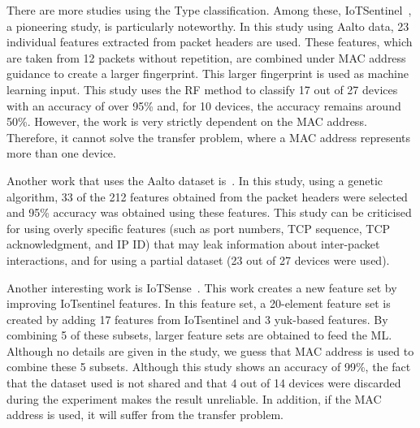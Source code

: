 \documentclass[journal]{IEEEtran}
\begin{document}
There are more studies using the Type classification. Among these, IoTSentinel~\cite{miettinen2017iot}, a pioneering study, is particularly noteworthy. In this study using Aalto data, 23 individual features extracted from packet headers are used. These features, which are taken from 12 packets without repetition, are combined under MAC address guidance to create a larger fingerprint.  This larger fingerprint is used as machine learning input.  This study uses the RF method to classify 17 out of 27 devices with an accuracy of over 95\% and, for 10 devices, the accuracy remains around 50\%. However, the work is very strictly dependent on the MAC address. Therefore, it cannot solve the transfer problem, where a MAC address represents more than one device.


Another work that uses the Aalto dataset is~\cite{aksoy2019automated}. In this study, using a genetic algorithm, 33 of the 212 features obtained from the packet headers were selected and 95\% accuracy was obtained using these features.  This study can be criticised for using overly specific features  (such as port numbers, TCP sequence, TCP
acknowledgment,  and IP ID) that may leak information about inter-packet interactions, and for using a partial dataset (23 out of 27 devices were used).

Another interesting work is IoTSense~\cite{bezawada2018behavioral}. This work creates a new feature set by improving IoTsentinel features. In this feature set, a 20-element feature set is created by adding 17 features from IoTsentinel and 3 yuk-based features. By combining 5 of these subsets, larger feature sets are obtained to feed the ML. Although no details are given in the study, we guess that MAC address is used to combine these 5 subsets. Although this study shows an accuracy of 99\%, the fact that the dataset used is not shared and that 4 out of 14 devices were discarded during the experiment makes the result unreliable. In addition, if the MAC address is used, it will suffer from the transfer problem.
\end{document}
